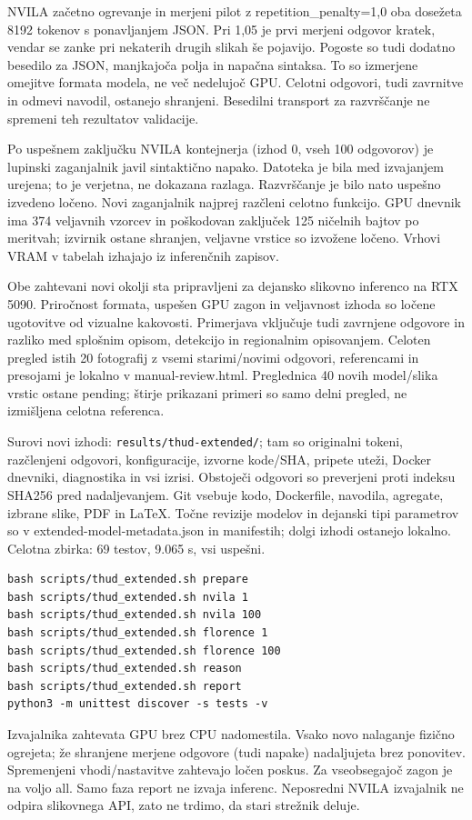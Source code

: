 NVILA začetno ogrevanje in merjeni pilot z repetition\_penalty=1,0 oba dosežeta 8192 tokenov s ponavljanjem JSON. Pri 1,05 je prvi merjeni odgovor kratek, vendar se zanke pri nekaterih drugih slikah še pojavijo. Pogoste so tudi dodatno besedilo za JSON, manjkajoča polja in napačna sintaksa. To so izmerjene omejitve formata modela, ne več nedelujoč GPU. Celotni odgovori, tudi zavrnitve in odmevi navodil, ostanejo shranjeni. Besedilni transport za razvrščanje ne spremeni teh rezultatov validacije.

Po uspešnem zaključku NVILA kontejnerja (izhod 0, vseh 100 odgovorov) je lupinski zaganjalnik javil sintaktično napako. Datoteka je bila med izvajanjem urejena; to je verjetna, ne dokazana razlaga. Razvrščanje je bilo nato uspešno izvedeno ločeno. Novi zaganjalnik najprej razčleni celotno funkcijo. GPU dnevnik ima 374 veljavnih vzorcev in poškodovan zaključek 125 ničelnih bajtov po meritvah; izvirnik ostane shranjen, veljavne vrstice so izvožene ločeno. Vrhovi VRAM v tabelah izhajajo iz inferenčnih zapisov.

Obe zahtevani novi okolji sta pripravljeni za dejansko slikovno inferenco na RTX 5090. Priročnost formata, uspešen GPU zagon in veljavnost izhoda so ločene ugotovitve od vizualne kakovosti. Primerjava vključuje tudi zavrnjene odgovore in razliko med splošnim opisom, detekcijo in regionalnim opisovanjem. Celoten pregled istih 20 fotografij z vsemi starimi/novimi odgovori, referencami in presojami je lokalno v manual-review.html. Preglednica 40 novih model/slika vrstic ostane pending; štirje prikazani primeri so samo delni pregled, ne izmišljena celotna referenca.

Surovi novi izhodi: \texttt{results/thud-extended/}; tam so originalni tokeni, razčlenjeni odgovori, konfiguracije, izvorne kode/SHA, pripete uteži, Docker dnevniki, diagnostika in vsi izrisi. Obstoječi odgovori so preverjeni proti indeksu SHA256 pred nadaljevanjem. Git vsebuje kodo, Dockerfile, navodila, agregate, izbrane slike, PDF in LaTeX. Točne revizije modelov in dejanski tipi parametrov so v extended-model-metadata.json in manifestih; dolgi izhodi ostanejo lokalno.
Celotna zbirka: 69 testov, 9.065 s, vsi uspešni.
\begin{verbatim}
bash scripts/thud_extended.sh prepare
bash scripts/thud_extended.sh nvila 1
bash scripts/thud_extended.sh nvila 100
bash scripts/thud_extended.sh florence 1
bash scripts/thud_extended.sh florence 100
bash scripts/thud_extended.sh reason
bash scripts/thud_extended.sh report
python3 -m unittest discover -s tests -v
\end{verbatim}
Izvajalnika zahtevata GPU brez CPU nadomestila. Vsako novo nalaganje fizično ogrejeta; že shranjene merjene odgovore (tudi napake) nadaljujeta brez ponovitev. Spremenjeni vhodi/nastavitve zahtevajo ločen poskus. Za vseobsegajoč zagon je na voljo all. Samo faza report ne izvaja inferenc. Neposredni NVILA izvajalnik ne odpira slikovnega API, zato ne trdimo, da stari strežnik deluje.


